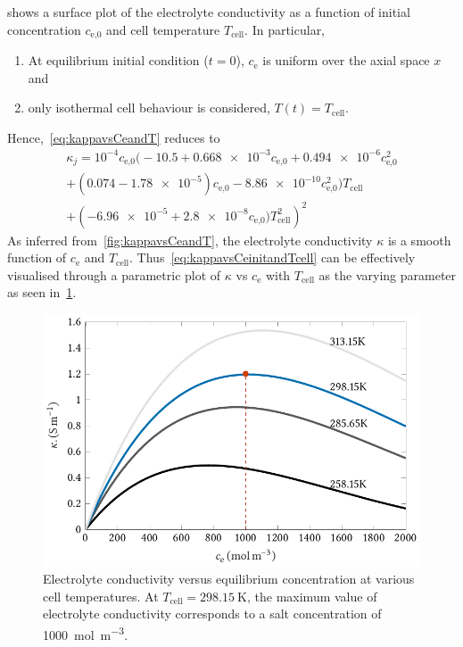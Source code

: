  shows  a surface  plot of the  electrolyte conductivity
as  a function  of  initial concentration  $c_\text{e,0}$  and cell  temperature
$T_\text{cell}$. In particular,
\begin{enumerate}%
    \item At  equilibrium  initial condition ($t=0$), $c_\text{e}$ is uniform over the axial space $x$ and
    \item only isothermal cell behaviour is considered, \ie{} $T(t) = T_\text{cell}$.
\end{enumerate}
Hence,~\cref{eq:kappavsCeandT} reduces to
\begin{multline}\label{eq:kappavsCeinitandTcell}
    \kappa_j =  10^{-4} c_\text{e,0} \bigl(-10.5 + \num{0.668e-3} c_\text{e,0} + \num{0.494e-6}  c_\text{e,0}^2\\
        + (0.074 - \num{1.78e-5}) c_\text{e,0} - \num{8.86e-10}
    c_\text{e,0}^2 \bigr)T_\text{cell}\\
	+ \left(\num{-6.96e-5} + \num{2.8e-8} c_\text{e,0})T_\text{cell}^2\right)^2
\end{multline}
As   inferred   from~\cref{fig:kappavsCeandT},  the   electrolyte   conductivity
$\kappa$   is   a  smooth   function   of   $c_\text{e}$  and   $T_\text{cell}$.
Thus~\cref{eq:kappavsCeinitandTcell}  can be  effectively  visualised through  a
parametric plot of $\kappa$ vs  $c_\text{e}$ with $T_\text{cell}$ as the varying
parameter as seen in~\cref{fig:kappavsce}.

\begin{figure}[!htb]
    \centering
    \includegraphics{4/figures/m2t_kappa_ce_parametric_T.pdf}
    \caption[]
    {Electrolyte conductivity versus equilibrium concentration at various cell
        temperatures. At ${T_\text{cell} = \SI{298.15}{\kelvin}}$, the maximum
        value of electrolyte conductivity corresponds to a salt concentration of
    \SI{1000}{\mol\per\meter\cubed}.}
    \label{fig:kappavsce}
\end{figure}

